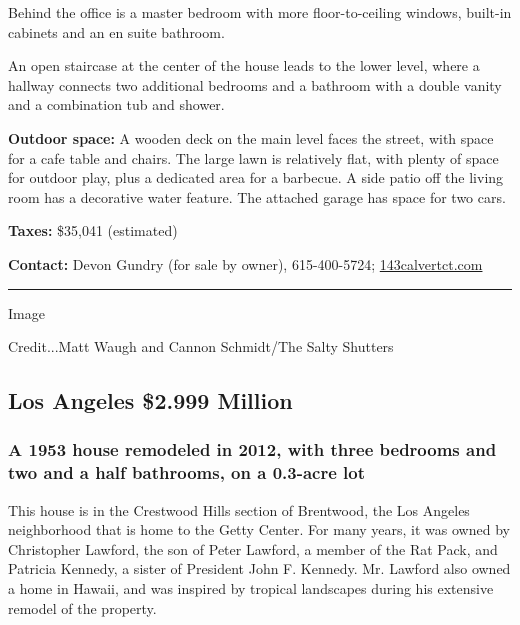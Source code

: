 Behind the office is a master bedroom with more floor-to-ceiling
windows, built-in cabinets and an en suite bathroom.

An open staircase at the center of the house leads to the lower level,
where a hallway connects two additional bedrooms and a bathroom with a
double vanity and a combination tub and shower.

\textbf{Outdoor space:} A wooden deck on the main level faces the
street, with space for a cafe table and chairs. The large lawn is
relatively flat, with plenty of space for outdoor play, plus a dedicated
area for a barbecue. A side patio off the living room has a decorative
water feature. The attached garage has space for two cars.

\textbf{Taxes:} \$35,041 (estimated)

\textbf{Contact:} Devon Gundry (for sale by owner), 615-400-5724;
\href{http://143calvertct.com/}{143calvertct.com}

\begin{center}\rule{0.5\linewidth}{\linethickness}\end{center}

Image

Credit...Matt Waugh and Cannon Schmidt/The Salty Shutters

\hypertarget{los-angeles--2999-million}{%
\subsection{Los Angeles \textbar{} \$2.999
Million}\label{los-angeles--2999-million}}

\hypertarget{a-1953-house-remodeled-in-2012-with-three-bedrooms-and-two-and-a-half-bathrooms-on-a-03-acre-lot}{%
\subsubsection{\texorpdfstring{\textbf{A 1953 house remodeled in 2012,
with three bedrooms and two and a half bathrooms, on a 0.3-acre
lot}}{A 1953 house remodeled in 2012, with three bedrooms and two and a half bathrooms, on a 0.3-acre lot}}\label{a-1953-house-remodeled-in-2012-with-three-bedrooms-and-two-and-a-half-bathrooms-on-a-03-acre-lot}}

This house is in the Crestwood Hills section of Brentwood, the Los
Angeles neighborhood that is home to the Getty Center. For many years,
it was owned by Christopher Lawford, the son of Peter Lawford, a member
of the Rat Pack, and Patricia Kennedy, a sister of President John F.
Kennedy. Mr. Lawford also owned a home in Hawaii, and was inspired by
tropical landscapes during his extensive remodel of the property.


